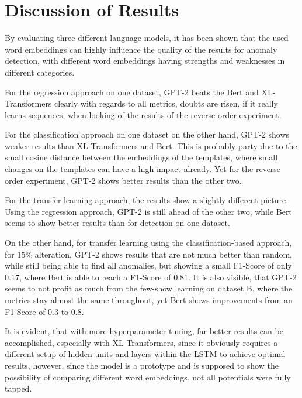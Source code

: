 \section{Discussion of Results\label{sec:discussion_results}}
By evaluating three different language models, it has been shown that the used word embeddings can highly influence the quality of the results for anomaly detection, with different word embeddings having strengths and weaknesses in different categories. 

\begin{comment}
For anomaly detection on one dataset using the regression approach, GPT-2 shows strong results, with F1-Scores of 0.95 when altering 5\% of log sequences, and 0.93 when altering the log lines, the quality of the results don't degrade much, when alteration ratios are increased, where Bert and XL-Transformers show decreases of 0.1 to 0.2 percentage points when increasing the alteration ratio from 5\% to 15\%. Yet, when the log events are completely reversed, GPT-2 achieves an F1-Score of only 0.55, where Bert and XL achieve 0.98, almost perfectly detecting the wrong sequence of log events.
\end{comment}

For the regression approach on one dataset, GPT-2 beats the Bert and XL-Transformers clearly with regards to all metrics, doubts are risen, if it really learns sequences, when looking of the results of the reverse order experiment.

For the classification approach on one dataset on the other hand, GPT-2   shows weaker results than XL-Transformers and Bert. This is probably party due to the small cosine distance between the embeddings of the templates, where small changes on the templates can have a high impact already. Yet for the reverse order experiment, GPT-2 shows better results than the other two.

For the transfer learning approach, the results show a slightly different picture. Using the regression approach, GPT-2 is still ahead of the other two, while Bert seems to show better results than for detection on one dataset. 

On the other hand, for transfer learning using the classification-based approach, for 15\% alteration, GPT-2 shows results that are not much better than random, while still being able to find all anomalies, but showing a small F1-Score of only 0.17, where Bert is able to reach a F1-Score of 0.81. It is also visible, that GPT-2 seems to not profit as much from the few-show learning on dataset B, where the metrics stay almost the same throughout, yet Bert shows improvements from an F1-Score of 0.3 to 0.8.

It is evident, that with more hyperparameter-tuning, far better results can be accomplished, especially with XL-Transformers, since it obviously requires a different setup of hidden units and layers within the LSTM to achieve optimal results, however, since the model is a prototype and is supposed to show the possibility of comparing different word embeddings, not all potentials were fully tapped.


